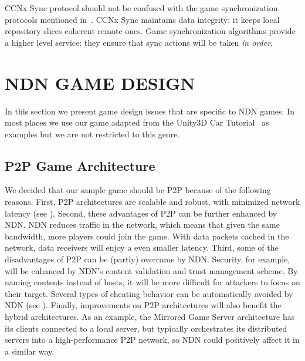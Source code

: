 \documentclass{sigchi}
\begin{document}
CCNx Sync protocol should not be confused with the game synchronization protocols mentioned in~. CCNx Sync maintains data integrity: it keeps local repository slices coherent remote ones. Game synchronization algorithms provide a higher level service: they ensure that sync actions will be taken \emph{in order}.




\section{NDN GAME DESIGN}
\label{gamedesign}


In this section we present game design issues that are specific to NDN games. In most places we use our game adapted from the Unity3D Car Tutorial~\cite{UnityCar} as examples but we are not restricted to this genre.


\subsection{P2P Game Architecture}

We decided that our sample game should be P2P because of the following reasons. First, P2P architectures are scalable and robust, with minimized network latency (see ). Second, these advantages of P2P can be further enhanced by NDN. NDN reduces traffic in the network, which means that given the same bandwidth, more players could join the game. With data packets cached in the network, data receivers will enjoy a even smaller latency. Third, some of the disadvantages of P2P can be (partly) overcame by NDN. Security, for example, will be enhanced by NDN's content validation and trust management scheme. By naming contents instead of hosts, it will be more difficult for attackers to focus on their target. Several types of cheating behavior can be automatically avoided by NDN (see ). Finally, improvements on P2P architectures will also benefit the hybrid architectures. As an example, the Mirrored Game Server architecture has its clients connected to a local server, but typically orchestrates its distributed servers into a high-performance P2P network, so NDN could positively affect it in a similar way.
\end{document}
